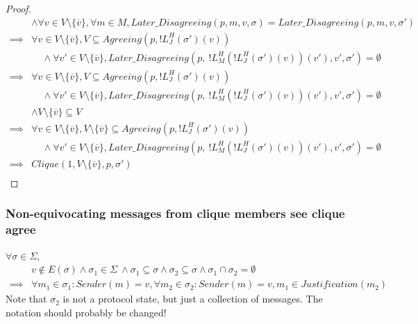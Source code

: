 \begin{proof}
\begin{align}
        &\land \forall v \in V \setminus \{\overline{v}\}, \forall m \in M, Later\_Disagreeing(p, m, v, \sigma) = Later\_Disagreeing(p, m, v, \sigma') \\
\implies& \forall v \in V \setminus \{\overline{v}\}, V \subseteq Agreeing(p, !L^H_J(\sigma')(v)) \\
        &~~~~~ \land \forall v' \in V \setminus \{\overline{v}\},Later\_Disagreeing(p,~!L^H_M(!L^H_J(\sigma')(v))(v'), v', \sigma') = \emptyset \\
\implies& \forall v \in V \setminus \{\overline{v}\}, V \subseteq Agreeing(p, !L^H_J(\sigma')(v)) \\
        &~~~~~ \land \forall v' \in V \setminus \{\overline{v}\},Later\_Disagreeing(p,~!L^H_M(!L^H_J(\sigma')(v))(v'), v', \sigma') = \emptyset \\
        &\land V \setminus \{\overline{v}\} \subseteq V \\
\implies& \forall v \in V \setminus \{\overline{v}\}, V \setminus \{\overline{v}\} \subseteq Agreeing(p, !L^H_J(\sigma')(v)) \\
        &~~~~~ \land \forall v' \in V \setminus \{\overline{v}\},Later\_Disagreeing(p,~!L^H_M(!L^H_J(\sigma')(v))(v'), v', \sigma') = \emptyset \\
\implies& Clique(1, V \setminus \{\overline{v}\}, p, \sigma') \\
\end{align}
\end{proof}


\subsubsection{Non-equivocating messages from clique members see clique agree}
\begin{lemma}
$\forall \sigma \in \Sigma$,
\begin{align}
        &v \notin E(\sigma) \land \sigma_1 \in \Sigma ~\land \sigma_1 \subseteq \sigma \land \sigma_2 \subseteq \sigma \land \sigma_1 \cap \sigma_2 = \emptyset \\
\implies& \forall m_1 \in \sigma_1 : Sender(m) = v, \forall m_2 \in \sigma_2 : Sender(m) = v, m_1 \in Justification(m_2)
\end{align}
Note that $\sigma_2$ is not a protocol state, but just a collection of messages. The notation should probably be changed!
\end{lemma}



